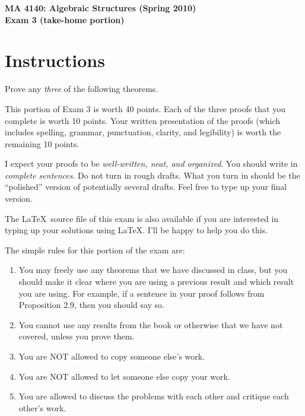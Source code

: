 \documentclass[11pt]{article}
\theoremstyle{definition}
\begin{document}
\begin{center}

{\Large\bf MA 4140: Algebraic Structures (Spring 2010)}\\
\smallskip
{\Large\bf Exam 3 (take-home portion)}

\bigskip


\end{center}

\setlength{\fboxsep}{10pt}

\section*{Instructions}

Prove any \emph{three} of the following theorems.

\bigskip

This portion of Exam 3 is worth 40 points.  Each of the three proofs that you complete is worth 10 points.  Your written presentation of the proofs (which includes spelling, grammar, punctuation, clarity, and legibility) is worth the remaining 10 points.

\bigskip

I expect your proofs to be \emph{well-written, neat, and organized}.  You should write in \emph{complete sentences}.  Do not turn in rough drafts.  What you turn in should be the ``polished'' version of potentially several drafts.  Feel free to type up your final version.  

\bigskip

The \LaTeX\ source file of this exam is also available if you are interested in typing up your solutions using \LaTeX.  I'll be happy to help you do this.

\bigskip

The simple rules for this portion of the exam are:

\begin{enumerate}
\item You may freely use any theorems that we have discussed in class, but you should make it clear where you are using a previous result and which result you are using.  For example, if a sentence in your proof follows from Proposition 2.9, then you should say so.
\item You cannot use any results from the book or otherwise that we have not covered, unless you prove them.
\item You are NOT allowed to copy someone else's work.
\item You are NOT allowed to let someone else copy your work.
\item You are allowed to discuss the problems with each other and critique each other's work.
\end{enumerate}
\end{document}
